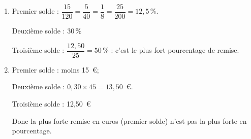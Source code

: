 
\medskip


\begin{enumerate}
\item %
Premier solde : $\dfrac{15}{120} = \dfrac{5}{40} = \dfrac{1}{8} = \dfrac{25}{200} = 12,5\,\%$.

Deuxième solde : 30\,\%

Troisième solde : $\dfrac{12,50}{25} = 50$\,\% : c'est le plus fort pourcentage de remise.
\item %

Premier solde : moins 15~\euro ;

Deuxième solde : $0,30 \times 45 = 13,50$~\euro.

Troisième solde : 12,50~\euro

Donc la plus forte remise en euros (premier solde) n'est pas la plus forte en pourcentage.
\end{enumerate}

\vspace{0,5cm}

